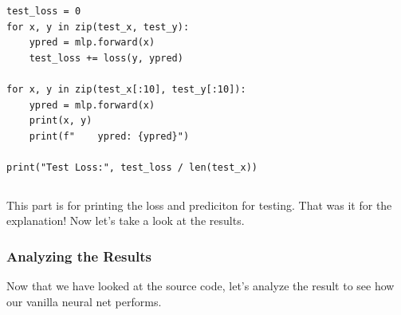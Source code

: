 \documentclass[../../../main.tex]{subfiles}
\begin{document}
\begin{jupyter}
\begin{lstlisting}[style=jin]
test_loss = 0
for x, y in zip(test_x, test_y):
    ypred = mlp.forward(x)
    test_loss += loss(y, ypred)

for x, y in zip(test_x[:10], test_y[:10]):
    ypred = mlp.forward(x)
    print(x, y)
    print(f"    ypred: {ypred}")

print("Test Loss:", test_loss / len(test_x))
\end{lstlisting}
\begin{lstlisting}[style=jout]
\end{lstlisting}
\end{jupyter}

This part is for printing the loss and prediciton for testing.
That was it for the explanation! Now let's take a look at the
results.

\subsubsection{Analyzing the Results}

Now that we have looked at the source code, let's analyze the result
to see how our vanilla neural net performs.
\end{document}
